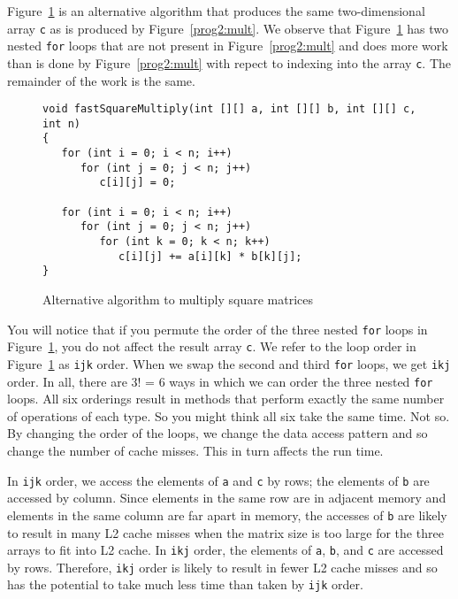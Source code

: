Figure~\ref{prog2:sqmult2} is an alternative algorithm that
produces the same two-dimensional array {\tt c} as is produced by
Figure~\ref{prog2:mult}. We observe that Figure~\ref{prog2:sqmult2}
has two nested {\tt for} loops
that are not present in Figure~\ref{prog2:mult} and
does more work than is done by Figure~\ref{prog2:mult} with repect to indexing
into the array {\tt c}.
The remainder of the work is the same.

\begin{figure}
\begin{verbatim}
void fastSquareMultiply(int [][] a, int [][] b, int [][] c, int n)
{
   for (int i = 0; i < n; i++)
      for (int j = 0; j < n; j++)
         c[i][j] = 0;

   for (int i = 0; i < n; i++)
      for (int j = 0; j < n; j++)
         for (int k = 0; k < n; k++)
            c[i][j] += a[i][k] * b[k][j];
}
\end{verbatim}
\caption{Alternative algorithm to multiply square matrices
\label{prog2:sqmult2}}
\end{figure}

You will notice that if you permute the order of the three nested
{\tt for} loops in Figure~\ref{prog2:sqmult2}, you do not
affect the result array {\tt c}. We refer to the loop
order in Figure~\ref{prog2:sqmult2} as {\tt ijk} order.
When we swap the second and third {\tt for} loops,
we get {\tt ikj} order.
In all, there are 3! = 6 ways in which we can order the three nested
{\tt for} loops. All six orderings result in methods that perform
exactly the same number of operations of each type.
So you might think all six take the same time. Not so.
By changing the order of the loops, we change the data access
pattern and so change the number of cache misses. This in
turn affects the run time.

In {\tt ijk} order, we access the elements of {\tt a} and {\tt c} by rows;
the elements of {\tt b} are accessed by column. Since elements in the
same row are in adjacent memory and elements in the same column are
far apart in memory, the accesses of {\tt b} are likely to result in many
L2 cache misses when the matrix size is too large for the three
arrays to fit into L2 cache.
In {\tt ikj} order, the elements of {\tt a}, {\tt b}, and {\tt c} are accessed
by rows. Therefore, {\tt ikj} order is likely to result in fewer L2 cache misses
and so has the potential to take much less time than taken by {\tt ijk} order.

